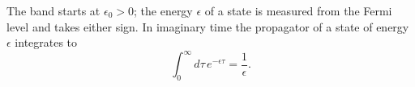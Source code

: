 \documentclass{article}
\begin{document}
The band starts at $\epsilon_0>0$; the energy $\epsilon$ of a state is measured from the Fermi level and
takes either sign. In imaginary time the propagator of a state of energy $\epsilon$ integrates to
\begin{equation}
\int_0^{\infty} d\tau\, e^{-\epsilon\tau} = \frac{1}{\epsilon} .
\label{eq:lap}
\end{equation}
\end{document}
